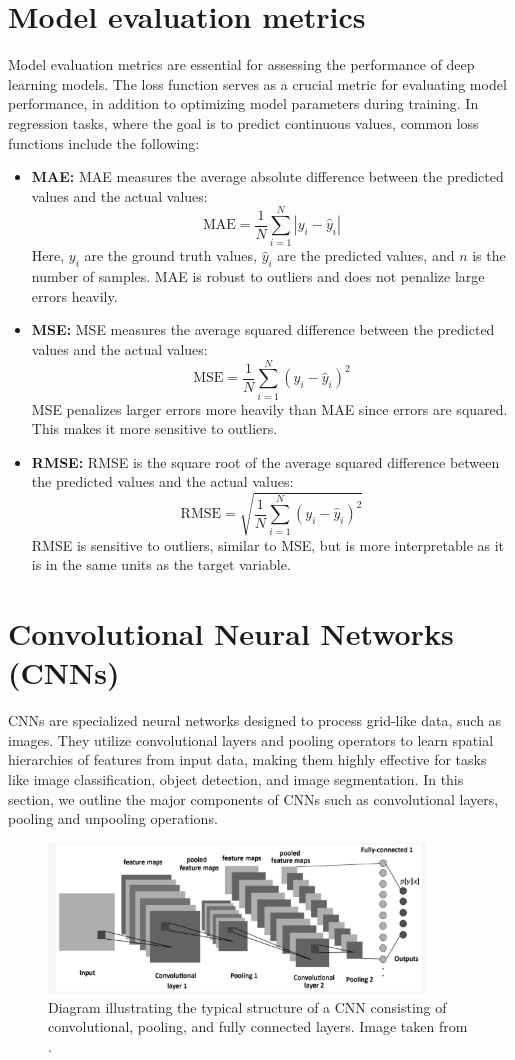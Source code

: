 \section{Model evaluation metrics}
Model evaluation metrics are essential for assessing the performance of deep learning models. The loss function serves as a crucial metric for evaluating model performance, in addition to optimizing model parameters during training. In regression tasks, where the goal is to predict continuous values, common loss functions include the following:
\begin{itemize}
\item \textbf{\gls{MAE}:} MAE measures the average absolute difference between the predicted values and the actual values:\[ \text{MAE} = \frac{1}{N} \sum_{i=1}^{N} |y_i - \hat{y}_i| \] Here, $y_i$ are the ground truth values, $\hat{y}_i$ are the predicted values, and $n$ is the number of samples. MAE is robust to outliers and does not penalize large errors heavily.
\item \textbf{\gls{MSE}:} MSE measures the average squared difference between the predicted values and the actual values:\[ \text{MSE} = \frac{1}{N} \sum_{i=1}^{N} (y_i - \hat{y}_i)^2 \] MSE penalizes larger errors more heavily than MAE since errors are squared. This makes it more sensitive to outliers. 
\item \textbf{\gls{RMSE}:} RMSE is the square root of the average squared difference between the predicted values and the actual values: \[ \text{RMSE} = \sqrt{\frac{1}{N} \sum_{i=1}^{N} (y_i - \hat{y}_i)^2} \]RMSE is sensitive to outliers, similar to MSE, but is more interpretable as it is in the same units as the target variable.
\end{itemize}
\section{Convolutional Neural Networks (CNNs)} \label{cnnse}
CNNs \cite{lecun1998} are specialized neural networks designed to process grid-like data, such as images. They utilize convolutional layers and pooling operators to learn spatial hierarchies of features from input data, making them highly effective for tasks like image classification, object detection, and image segmentation. In this section, we outline the major components of CNNs such as convolutional layers, pooling and unpooling operations. 
\begin{figure}[ht]
    \centering
    \includegraphics[width=10cm]{images/Theory-DL/CNN.png}
    \caption{Diagram illustrating the typical structure of a CNN consisting of convolutional, pooling, and fully connected layers. Image taken from \cite{cnnimage}.}
    \label{fig:CNN}
  \end{figure}
